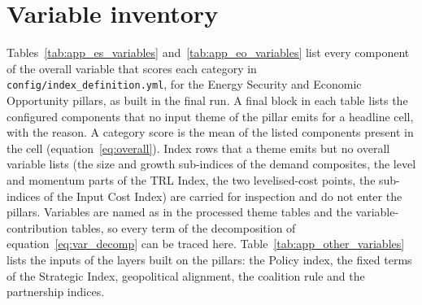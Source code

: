 
\section{Variable inventory}\label{app:variables}

Tables~\ref{tab:app_es_variables} and~\ref{tab:app_eo_variables} list every component of the
overall variable that scores each category in \texttt{config/index\_definition.yml}, for the
Energy Security and Economic Opportunity pillars, as built in the final run. A final block in each
table lists the configured components that no input theme of the pillar emits for a headline cell,
with the reason. A category score is the mean of the listed components present in the cell
(equation~\eqref{eq:overall}). Index rows that a theme emits but no overall variable lists (the
size and growth sub-indices of the demand composites, the level and momentum parts of the TRL
Index, the two levelised-cost points, the sub-indices of the Input Cost Index) are carried for
inspection and do not enter the pillars. Variables are named as in the processed theme tables and
the variable-contribution tables, so every term of the decomposition of
equation~\eqref{eq:var_decomp} can be traced here. Table~\ref{tab:app_other_variables} lists the
inputs of the layers built on the pillars: the Policy index, the fixed terms of the Strategic
Index, geopolitical alignment, the coalition rule and the partnership indices.

